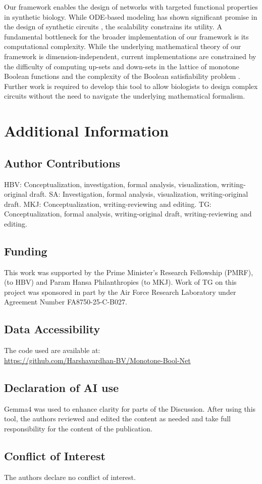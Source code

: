 \documentclass[12pt]{amsart}
\theoremstyle{definition}
\begin{document}
Our framework enables the design of networks with targeted functional properties in synthetic biology. While ODE-based modeling has shown significant promise in the design of synthetic circuits \cite{santos-moreno_robustness_2023, zhu_synthetic_2022}, the scalability constrains its utility. A fundamental bottleneck for the broader implementation of our framework is its computational complexity. While the underlying mathematical theory of our framework is dimension-independent, current implementations are constrained by the difficulty of computing up-sets and down-sets in the lattice of monotone Boolean functions and the complexity of the Boolean satisfiability problem \cite{chevalier_synthesis_2019}. Further work is required to develop this tool to allow biologists to design complex circuits without the need to navigate the underlying mathematical formalism.

\section*{Additional Information}

\subsection*{Author Contributions}
HBV: Conceptualization, investigation, formal analysis, visualization, writing-original draft.
SA: Investigation, formal analysis, visualization, writing-original draft. 
MKJ: Conceptualization, writing-reviewing and editing. 
TG: Conceptualization, formal analysis, writing-original draft, writing-reviewing and editing.
 
\subsection*{Funding}
This work was supported by the Prime Minister’s Research Fellowship (PMRF), (to HBV) and  Param Hansa Philanthropies (to MKJ). Work of TG on this  project was sponsored in part by the Air Force Research Laboratory under Agreement Number FA8750-25-C-B027.

\subsection*{Data Accessibility}
The code used are available at:\\ \url{https://github.com/Harshavardhan-BV/Monotone-Bool-Net}

\subsection*{Declaration of AI use}
Gemma4 was used to enhance clarity for parts of the Discussion. After using this tool, the authors reviewed and edited the content as needed and take full responsibility for the content of the publication.

\subsection*{Conflict of Interest}
The authors declare no conflict of interest.



\end{document}
